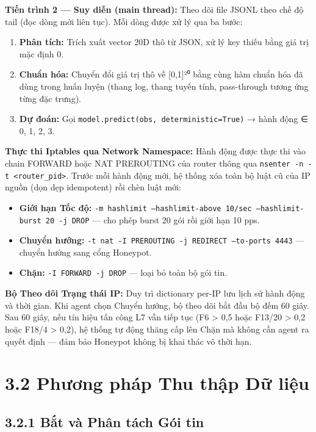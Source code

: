 \documentclass[12pt,a4paper,twoside]{report}
\begin{document}
{\textbf{Tiến trình 2 — Suy diễn (main thread):} Theo dõi file JSONL theo chế độ tail (đọc dòng mới liên tục). Mỗi dòng được xử lý qua ba bước:
\begin{enumerate}
\item \textbf{Phân tích:} Trích xuất vector 20D thô từ JSON, xử lý key thiếu bằng giá trị mặc định 0.
\item \textbf{Chuẩn hóa:} Chuyển đổi giá trị thô về [0,1]²⁰ bằng cùng hàm chuẩn hóa đã dùng trong huấn luyện (thang log, thang tuyến tính, pass-through tương ứng từng đặc trưng).
\item \textbf{Dự đoán:} Gọi \texttt{model.predict(obs, deterministic=True)} → hành động ∈ {0, 1, 2, 3}.
\end{enumerate}

\textbf{Thực thi Iptables qua Network Namespace:} Hành động được thực thi vào chain FORWARD hoặc NAT PREROUTING của router thông qua \texttt{nsenter -n -t <router_pid>}. Trước mỗi hành động mới, hệ thống xóa toàn bộ luật cũ của IP nguồn (dọn dẹp idempotent) rồi chèn luật mới:
\begin{itemize}
\item \textbf{Giới hạn Tốc độ:} \texttt{-m hashlimit --hashlimit-above 10/sec --hashlimit-burst 20 -j DROP} — cho phép burst 20 gói rồi giới hạn 10 pps.
\item \textbf{Chuyển hướng:} \texttt{-t nat -I PREROUTING -j REDIRECT --to-ports 4443} — chuyển hướng sang cổng Honeypot.
\item \textbf{Chặn:} \texttt{-I FORWARD -j DROP} — loại bỏ toàn bộ gói tin.
\end{itemize}

\textbf{Bộ Theo dõi Trạng thái IP:} Duy trì dictionary per-IP lưu lịch sử hành động và thời gian. Khi agent chọn Chuyển hướng, bộ theo dõi bắt đầu bộ đếm 60 giây. Sau 60 giây, nếu tín hiệu tấn công L7 vẫn tiếp tục (F6 > 0,5 hoặc F13/20 > 0,2 hoặc F18/4 > 0,2), hệ thống tự động thăng cấp lên Chặn mà không cần agent ra quyết định — đảm bảo Honeypot không bị khai thác vô thời hạn.


\section{3.2 Phương pháp Thu thập Dữ liệu}

\subsection{3.2.1 Bắt và Phân tách Gói tin}

}
\end{document}
